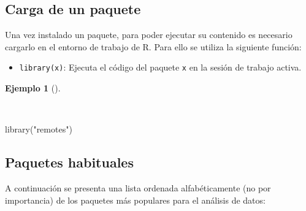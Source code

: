 \documentclass[
  a4paper,
]{scrreport}
\newenvironment{Shaded}{\begin{snugshade}}{\end{snugshade}}
\newcommand{\FunctionTok}[1]{\textcolor[rgb]{0.28,0.35,0.67}{#1}}
\newcommand{\NormalTok}[1]{\textcolor[rgb]{0.00,0.23,0.31}{#1}}
\newcommand{\StringTok}[1]{\textcolor[rgb]{0.13,0.47,0.30}{#1}}
\providecommand{\tightlist}{%
  \setlength{\itemsep}{0pt}\setlength{\parskip}{0pt}}\usepackage{longtable,booktabs,array}
\theoremstyle{definition}
\theoremstyle{definition}
\newtheorem{example}{Ejemplo}[chapter]
\theoremstyle{remark}
\begin{document}
\hypertarget{carga-de-un-paquete}{%
\subsection{Carga de un paquete}\label{carga-de-un-paquete}}

Una vez instalado un paquete, para poder ejecutar su contenido es
necesario cargarlo en el entorno de trabajo de R. Para ello se utiliza
la siguiente función:

\begin{itemize}
\tightlist
\item
  \texttt{library(x)}: Ejecuta el código del paquete \texttt{x} en la
  sesión de trabajo activa.
\end{itemize}

\begin{example}[]\protect\hypertarget{exm-carga-paquetes}{}\label{exm-carga-paquetes}

~

\begin{Shaded}
\begin{Highlighting}[]
\FunctionTok{library}\NormalTok{(}\StringTok{"remotes"}\NormalTok{)}
\end{Highlighting}
\end{Shaded}

\end{example}

\hypertarget{paquetes-habituales}{%
\subsection{Paquetes habituales}\label{paquetes-habituales}}

A continuación se presenta una lista ordenada alfabéticamente (no por
importancia) de los paquetes más populares para el análisis de datos:
\end{document}
